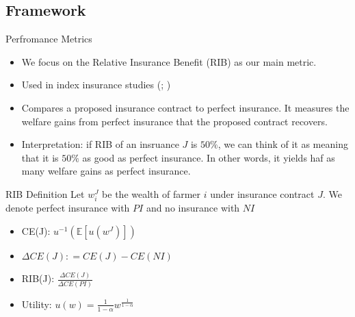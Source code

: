 \documentclass{beamer}
\begin{document}
\subsection{Framework}
\begin{frame}{Perfromance Metrics}
    \begin{itemize}
        \item We focus on the Relative Insurance Benefit (RIB) as our main metric. 
        \item Used in index insurance studies (\cite{kenduiywo2021evaluating}; \cite{estefania2024breaking})
        \item Compares a proposed insurance contract to perfect insurance. It measures the welfare gains from perfect insurance that the proposed contract recovers. 
        \item Interpretation: if RIB of an insruance $J$ is $50\%$, we can think of it as meaning that it is $50\%$ as good as perfect insurance. In other words, it yields haf as many welfare gains as perfect insurance. 
    \end{itemize}
    
\end{frame}

\begin{frame}{RIB Definition}
    Let $w^J_i$ be the wealth of farmer $i$ under insurance contract $J$. We denote perfect insurance with $PI$ and no insurance with $NI$
    \begin{itemize}
        \setlength\itemsep{1em}
        \item CE(J): $u^{-1}(\mathbb{E}[u(w^J)])$ 
        \item $\Delta CE(J): = CE(J) - CE(NI)$
        \item RIB(J): $\frac{\Delta CE(J)}{\Delta CE(PI)}$
        \item Utility: $u(w) = \frac{1}{1-\alpha} w^{\frac{1}{1-\alpha}}$
    \end{itemize}
    
\end{frame}
\end{document}
